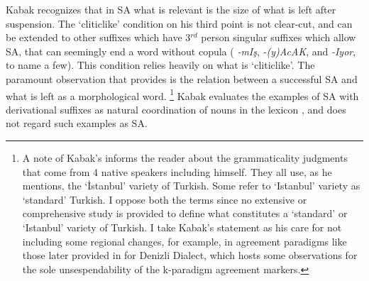Kabak recognizes that in SA what is relevant is the size of what is left after suspension. The `cliticlike' condition on his third point is not clear-cut, and can be extended to other suffixes which have 3$^{rd}$ person singular suffixes which allow SA, that can seemingly end a word without copula ( \textit{-mIş}, \textit{-(y)AcAK}, and \textit{-Iyor}, to name a few). This condition relies heavily on what is `cliticlike'. The paramount observation that \cite{kabak2007turkish} provides is the relation between a successful SA and what is left as a morphological word. \footnote{A note of Kabak's informs the reader about the grammaticality judgments that come from 4 native speakers including himself. They all use, as he mentions, the `İstanbul' variety of Turkish. Some refer to `Istanbul' variety as `standard' Turkish. I oppose both the terms since no extensive or comprehensive study is provided to define what constitutes a `standard' or `Istanbul' variety of Turkish. I take Kabak's statement as his care for not including some regional changes, for example, in agreement paradigms like those later provided in \cite{saug2013verbal} for Denizli Dialect, which hosts some observations for the sole unsespendability of the k-paradigm agreement markers.} Kabak evaluates the examples of SA with derivational suffixes as natural coordination of nouns in the lexicon \citep{walchli2005co}, and does not regard such examples as SA.

